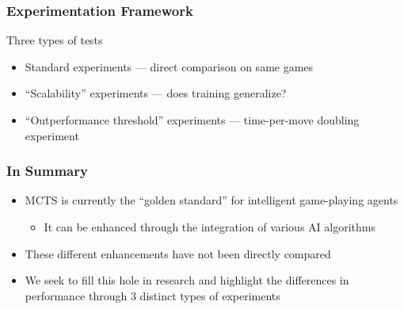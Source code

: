 \documentclass{beamer}
\begin{document}
\begin{frame}
\frametitle{Experimentation Framework}
Three types of tests
\begin{itemize}
\item Standard experiments --- direct comparison on same games
\item ``Scalability'' experiments --- does training generalize?
\item ``Outperformance threshold'' experiments --- time-per-move doubling experiment
\end{itemize}
\end{frame}

\begin{frame}
\frametitle{In Summary}
\begin{itemize}
\item MCTS is currently the ``golden standard'' for intelligent game-playing agents
\begin{itemize}
\item It can be enhanced through the integration of various AI algorithms
\end{itemize}
\item These different enhancements have not been directly compared
\item We seek to fill this hole in research and highlight the differences in performance through 3 distinct types of experiments
\end{itemize}
\end{frame}
\end{document}
